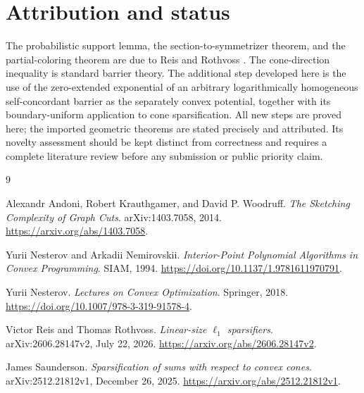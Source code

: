 \documentclass[11pt]{article}
\begin{document}
\section*{Attribution and status}

The probabilistic support lemma, the section-to-symmetrizer theorem,
and the partial-coloring theorem are due to Reis and Rothvoss
\cite{RR26}. The cone-direction inequality is standard barrier theory.
The additional step developed here is the use of the zero-extended
exponential of an arbitrary logarithmically homogeneous
self-concordant barrier as the separately convex potential, together
with its boundary-uniform application to cone sparsification.
All new steps are proved here; the imported geometric theorems are
stated precisely and attributed. Its novelty assessment should be
kept distinct from correctness and requires a complete literature
review before any submission or public priority claim.

\begin{thebibliography}{9}

Alexandr Andoni, Robert Krauthgamer, and David P. Woodruff.
\emph{The Sketching Complexity of Graph Cuts}.
arXiv:1403.7058, 2014.
\url{https://arxiv.org/abs/1403.7058}.

Yurii Nesterov and Arkadii Nemirovskii.
\emph{Interior-Point Polynomial Algorithms in Convex Programming}.
SIAM, 1994. \url{https://doi.org/10.1137/1.9781611970791}.

Yurii Nesterov.
\emph{Lectures on Convex Optimization}.
Springer, 2018. \url{https://doi.org/10.1007/978-3-319-91578-4}.

Victor Reis and Thomas Rothvoss.
\emph{Linear-size $\ell_1$ sparsifiers}.
arXiv:2606.28147v2, July 22, 2026.
\url{https://arxiv.org/abs/2606.28147v2}.

James Saunderson.
\emph{Sparsification of sums with respect to convex cones}.
arXiv:2512.21812v1, December 26, 2025.
\url{https://arxiv.org/abs/2512.21812v1}.

\end{thebibliography}
\end{document}

